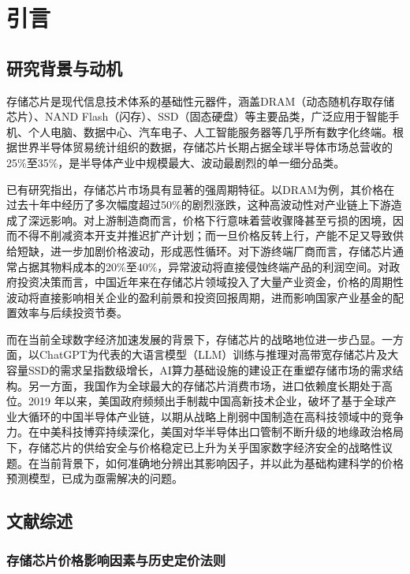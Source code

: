 \documentclass[a4paper,12pt,fontset=fandol]{ctexart}
\begin{document}
\setcounter{page}{1}

\section{引言}

\subsection{研究背景与动机}
存储芯片是现代信息技术体系的基础性元器件，涵盖DRAM（动态随机存取存储芯片）、NAND Flash（闪存）、SSD（固态硬盘）等主要品类，广泛应用于智能手机、个人电脑、数据中心、汽车电子、人工智能服务器等几乎所有数字化终端。根据世界半导体贸易统计组织的数据，存储芯片长期占据全球半导体市场总营收的25\%至35\%，是半导体产业中规模最大、波动最剧烈的单一细分品类\cite{kang2010}。

已有研究指出，存储芯片市场具有显著的强周期特征。以DRAM为例，其价格在过去十年中经历了多次幅度超过50\%的剧烈涨跌，这种高波动性对产业链上下游造成了深远影响。对上游制造商而言，价格下行意味着营收骤降甚至亏损的困境，因而不得不削减资本开支并推迟扩产计划；而一旦价格反转上行，产能不足又导致供给短缺，进一步加剧价格波动，形成恶性循环。对下游终端厂商而言，存储芯片通常占据其物料成本的20\%至40\%，异常波动将直接侵蚀终端产品的利润空间。对政府投资决策而言，中国近年来在存储芯片领域投入了大量产业资金，价格的周期性波动将直接影响相关企业的盈利前景和投资回报周期，进而影响国家产业基金的配置效率与后续投资节奏。

而在当前全球数字经济加速发展的背景下，存储芯片的战略地位进一步凸显。一方面，以ChatGPT为代表的大语言模型（LLM）训练与推理对高带宽存储芯片及大容量SSD的需求呈指数级增长，AI算力基础设施的建设正在重塑存储市场的需求结构。另一方面，我国作为全球最大的存储芯片消费市场，进口依赖度长期处于高位。2019 年以来，美国政府频频出手制裁中国高新技术企业，破坏了基于全球产业大循环的中国半导体产业链，以期从战略上削弱中国制造在高科技领域中的竞争力\cite{wuxiaobo2021}。在中美科技博弈持续深化，美国对华半导体出口管制不断升级的地缘政治格局下，存储芯片的供给安全与价格稳定已上升为关乎国家数字经济安全的战略性议题\cite{luo2023}。在当前背景下，如何准确地分辨出其影响因子，并以此为基础构建科学的价格预测模型，已成为亟需解决的问题。

\subsection{文献综述}
\subsubsection{存储芯片价格影响因素与历史定价法则}
\end{document}
